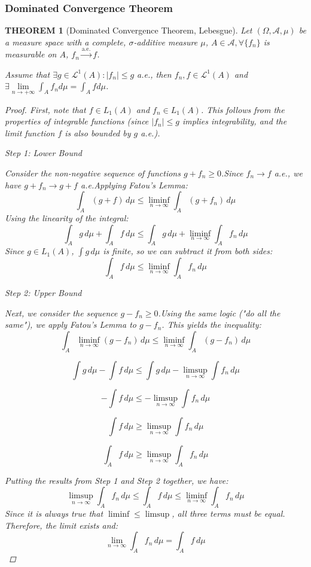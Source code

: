 \documentclass[12pt]{article}
\theoremstyle{blueplain}
\newtheorem{theorem}{THEOREM}[section]
\theoremstyle{bluedef}
\theoremstyle{blueremark}
\numberwithin{equation}{section}
\begin{document}
\subsubsection{Dominated Convergence Theorem}

\begin{theorem}[Dominated Convergence Theorem, Lebesgue]

  Let $(\Omega, \mathcal{A}, \mu)$ be a measure space with a complete, $\sigma$-additive measure $\mu$, $A \in \mathcal{A}, \forall \{f_n\}$ is measurable on $A$, $f_n \overset{\text{a.e.}}{\rightarrow} f$.

  Assume that $\exists g \in \mathcal{L}^1(A): |f_n| \leq g$ a.e., then $f_n, f \in \mathcal{L}^1(A)$ and $\exists \lim\limits_{n \to +\infty} \int_A f_n d\mu = \int_A f d\mu$.

  \begin{proof}
    First, note that $f \in L_1(A)$ and $f_n \in L_1(A)$. This follows from the properties of integrable functions (since $|f_n| \le g$ implies integrability, and the limit function $f$ is also bounded by $g$ a.e.).

    Step 1: Lower Bound

    Consider the non-negative sequence of functions $g + f_n \ge 0$.Since $f_n \to f$ a.e., we have $g + f_n \to g + f$ a.e.Applying Fatou's Lemma:$$\int_A (g+f) \, d\mu \le \liminf_{n\to\infty} \int_A (g+f_n) \, d\mu$$Using the linearity of the integral:$$\int_A g \, d\mu + \int_A f \, d\mu \le \int_A g \, d\mu + \liminf_{n\to\infty} \int_A f_n \, d\mu$$Since $g \in L_1(A)$, $\int g \, d\mu$ is finite, so we can subtract it from both sides:$$\int_A f \, d\mu \le \liminf_{n\to\infty} \int_A f_n \, d\mu$$

    Step 2: Upper Bound

    Next, we consider the sequence $g - f_n \ge 0$.Using the same logic ("do all the same"), we apply Fatou's Lemma to $g - f_n$. This yields the inequality:$$\int_A \liminf_{n\to\infty} (g - f_n) \, d\mu \le \liminf_{n\to\infty} \int_A (g - f_n) \, d\mu$$

    $$\int g \, d\mu - \int f \, d\mu \le \int g \, d\mu - \limsup_{n\to\infty} \int f_n \, d\mu$$

    $$- \int f \, d\mu \le - \limsup_{n\to\infty} \int f_n \, d\mu$$

    $$\int f \, d\mu \ge \limsup_{n\to\infty} \int f_n \, d\mu$$

    $$\int_A f \, d\mu \ge \limsup_{n\to\infty} \int_A f_n \, d\mu$$

    Putting the results from Step 1 and Step 2 together, we have:$$\limsup_{n\to\infty} \int_A f_n \, d\mu \le \int_A f \, d\mu \le \liminf_{n\to\infty} \int_A f_n \, d\mu$$Since it is always true that $\liminf \le \limsup$, all three terms must be equal. Therefore, the limit exists and:$$\lim_{n\to\infty} \int_A f_n \, d\mu = \int_A f \, d\mu$$



  \end{proof}
\end{theorem}
\end{document}
